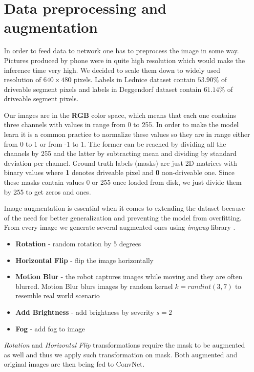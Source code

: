 \section{Data preprocessing and augmentation}
\label{sec:data_augment}

In order to feed data to network one has to preprocess the image in some way.
Pictures produced by phone were in quite high resolution which would make the inference
time very high. We decided to scale them down to widely used resolution of
$640\times 480$ pixels. Labels in Lednice dataset contain $53.90\%$ of driveable segment
pixels and labels in Deggendorf dataset contain $61.14\%$ of driveable segment pixels.

Our images are in the \textbf{RGB} color space, which means that each one contains three channels
with values in range from 0 to 255. In order to make the model learn it is a common practice
to normalize these values so they are in range either from 0 to 1 or from -1 to 1. The former
can be reached by dividing all the channels by 255 and the latter by subtracting
mean and dividing by standard deviation per channel. Ground truth labels (masks) are just
2D matrices with binary values where \textbf{1} denotes driveable pixel and \textbf{0}
non-driveable one. Since these masks contain values 0 or 255 once loaded from disk,
we just divide them by 255 to get zeros and ones.

Image augmentation is essential when it comes to extending the dataset because of the need
for better generalization and preventing the model from overfitting.
From every image we generate several
augmented ones using \textit{imgaug} library \cite{bib:imgaug}.

\begin{itemize}
    \item \textbf{Rotation} - random rotation by 5 degrees
    \item \textbf{Horizontal Flip} - flip the image horizontally
    \item \textbf{Motion Blur} - the robot captures images while moving and they are
        often blurred. Motion Blur blurs images by random kernel $k=randint(3, 7)$
        to resemble real world scenario
    \item \textbf{Add Brightness} - add brightness by severity $s = 2$
    \item \textbf{Fog} - add fog to image
\end{itemize}

\textit{Rotation} and \textit{Horizontal Flip} transformations require the mask
to be augmented as well and thus we apply such transformation on mask.
Both augmented and original images are then being fed to ConvNet.

